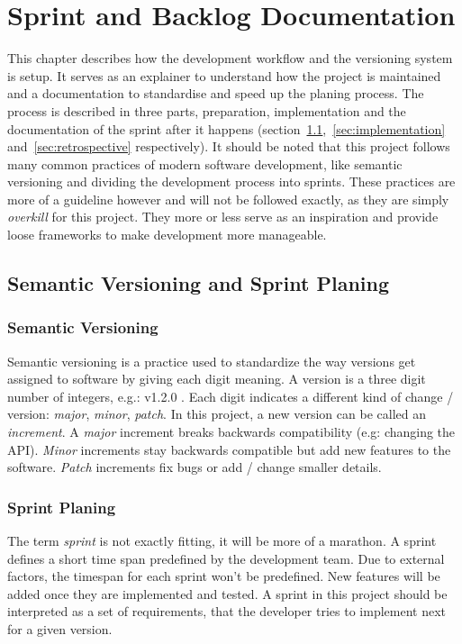 \chapter{Sprint and Backlog Documentation}\label{cha:sprint_and_backlog_documentation}\thispagestyle{fancy}
This chapter describes how the development workflow and the versioning system is setup. It serves
as an explainer to understand how the project is maintained and a documentation to standardise and
speed up the planing process. The process is described in three parts, preparation, implementation and the
documentation of the sprint after it happens (section~\ref{sec:sprint_planing_and_versioning},~\ref{sec:implementation}
and~\ref{sec:retrospective} respectively). It should be noted that this project follows many common practices of modern
software development, like semantic versioning and dividing the development process into sprints. These practices
are more of a guideline however and will not be followed exactly, as they are simply \emph{overkill} for this project.
They more or less serve as an inspiration and provide loose frameworks to make development more manageable.

\section{Semantic Versioning and Sprint Planing}\label{sec:sprint_planing_and_versioning}
\subsection{Semantic Versioning}
Semantic versioning is a practice used to standardize the way versions get assigned to software by giving each digit meaning. A
version is a three digit number of integers, e.g.: v{\color{red}1}.{\color{blue}2}.{\color{green}0} . Each digit indicates a
different kind of change / version: {\color{red}\emph{major}}, {\color{blue}\emph{minor}}, {\color{green}\emph{patch}}.
In this project, a new version can be called an \emph{increment}. A \emph{major} increment breaks backwards compatibility (e.g:
changing the API). \emph{Minor} increments stay  backwards compatible but add new features to the software. \emph{Patch}
increments fix bugs or add / change smaller details.

\subsection{Sprint Planing}
The term \emph{sprint} is not exactly fitting, it will be more of a marathon. A sprint defines a short time span predefined by the
development team. Due to external factors, the timespan for each sprint won't be predefined. New features will be added once
they are implemented and tested. A sprint in this project should be interpreted as a set of requirements, that the developer tries
to implement next for a given version.

